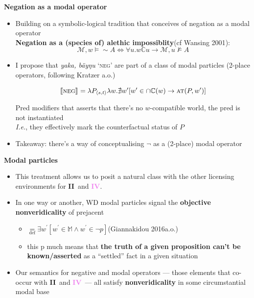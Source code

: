 \documentclass[dvipsnames]{beamer}%
\providecommand{\denote}[2][]{\ensuremath{\llbracket{#2}\rrbracket^{#1}}}
\newcommand{\II}{\textbf{\textcolor{ochre}{II}}}
\newcommand{\IV}{\textbf{\textcolor{violet}{IV}}}
\begin{document}
\begin{frame}{\textbf{Negation as a modal operator}}
	\begin{itemize}
		\item<1-> Building on a symbolic-logical tradition that conceives of negation as a modal operator\\
		 \textbf{Negation as a (species of) alethic impossiblity}\hfill(cf {\small Wansing 2001}):$$\mathcal M,w\vDash\sim A\iff \forall u.w\mathbb C u\to\mathcal M,u\not\vDash A$$
		 
		\item<2-> I propose that \textit{yaka, bäyŋu} \textsc{`neg'} are part of a class of modal particles (2-place operators, following Kratzer a.o.)
		
			 $$ \denote{\textsc{neg}} = \lambda P_{\langle s,t\rangle}\lambda w. \nexists w^\prime[w^\prime\in\cap\mathbb C(w)\to\textsc{at}(P,w^\prime)] $$
			 
			{\small Pred modifiers that asserts that there's no $ w $-compatible world, the pred is not instantiated\\
			 \textit{I.e.}, they effectively mark the counterfactual status of $ P $}
			 
		\item<3-> Takeaway: there's a way of conceptualising $ \neg $ as a (2-place) modal operator
\end{itemize}\end{frame}
\begin{frame}{\textbf{Modal particles}}
		
	\begin{itemize}	
			\item This treatment allows us to posit a natural class with the other licensing environments for \II~and \IV.\pause
			\item In one way or another, WD modal particles signal the \textbf{objective nonveridicality} of prejacent
			\begin{itemize}
				\item $\underset{\text{def}}{=} \exists w^\prime[w^\prime\in\mathbb M\wedge w^\prime\in\neg p]$\hspace{2in}\footnotesize (Giannakidou 2016a.o.)
				\item this p much means that \textbf{the truth of a given proposition can't be known/asserted} as a ``settled'' fact in a given situation
			\end{itemize}
			\item Our semantics for negative and modal operators --- those elements that co-occur with \II~and \IV~--- all satisfy \textbf{nonveridicality} in some circumstantial modal base
	\end{itemize}
\end{frame}
\end{document}
